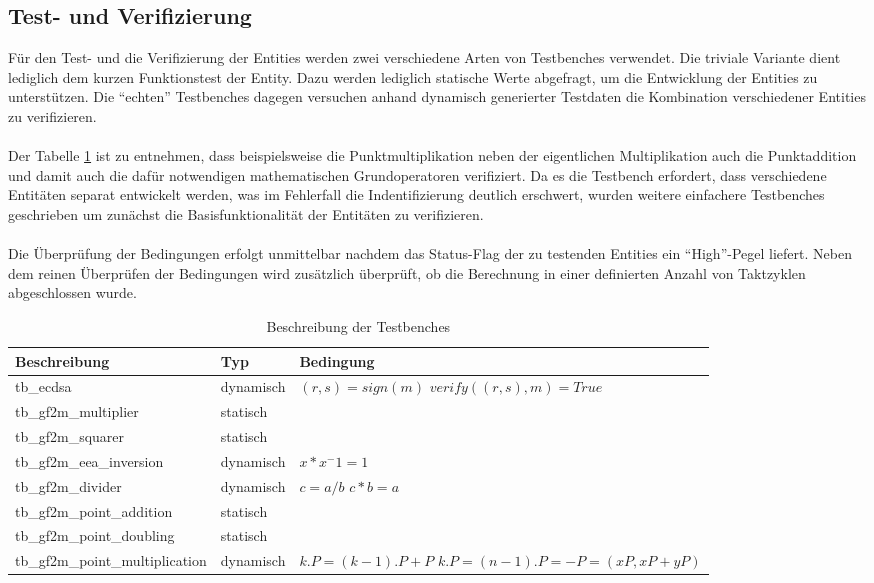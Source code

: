 \subsection{Test- und Verifizierung}
Für den Test- und die Verifizierung der Entities werden zwei verschiedene Arten von Testbenches verwendet. Die triviale Variante dient lediglich dem kurzen Funktionstest der Entity. Dazu werden lediglich statische Werte abgefragt, um die Entwicklung der Entities zu unterstützen. Die ``echten'' Testbenches dagegen versuchen anhand dynamisch generierter Testdaten die Kombination verschiedener Entities zu verifizieren.
\\ \\
Der Tabelle \ref{tab:vhdl-impl-testbenches} ist zu entnehmen, dass beispielsweise die Punktmultiplikation neben der eigentlichen Multiplikation auch die Punktaddition und damit auch die dafür notwendigen mathematischen Grundoperatoren verifiziert. Da es die Testbench erfordert, dass verschiedene Entitäten separat entwickelt werden, was im Fehlerfall die Indentifizierung deutlich erschwert, wurden weitere einfachere Testbenches geschrieben um zunächst die Basisfunktionalität der Entitäten zu verifizieren.
\\ \\
Die Überprüfung der Bedingungen erfolgt unmittelbar nachdem das Status-Flag der zu testenden Entities ein ``High''-Pegel liefert. Neben dem reinen Überprüfen der Bedingungen wird zusätzlich überprüft, ob die Berechnung in einer definierten Anzahl von Taktzyklen abgeschlossen wurde.

\begin{table} [h]
	\centering 
	\begin{tabular}{ | p{5cm} | p{2cm} | p{8cm} | }
		\hline
		\textbf{Beschreibung} & \textbf{Typ} & \textbf{Bedingung}\\
		\hline
		tb\_ecdsa &  dynamisch & \parbox[t]{5cm}{$(r,s)=sign(m)$\\$verify((r,s),m)=True$}  \\
		\hline
		tb\_gf2m\_multiplier & statisch & $ $ \\
		\hline
		tb\_gf2m\_squarer & statisch & $ $ \\
		\hline
		tb\_gf2m\_eea\_inversion & dynamisch & $x * x^-1 = 1$ \\
		\hline
		tb\_gf2m\_divider & dynamisch & \parbox[t]{5cm}{$c=a/b$\\$c*b=a$} \\
		\hline
		tb\_gf2m\_point\_addition & statisch & $ $ \\
		\hline
		tb\_gf2m\_point\_doubling & statisch & $ $ \\
		\hline
		tb\_gf2m\_point\_multiplication & dynamisch & \parbox[t]{10cm}{$k.P = (k-1).P + P$\\$k.P = (n-1).P = -P = (xP, xP+yP)$} \\
		\hline
	\end{tabular}
	\caption{Beschreibung der Testbenches}
	\label{tab:vhdl-impl-testbenches}
\end{table}

